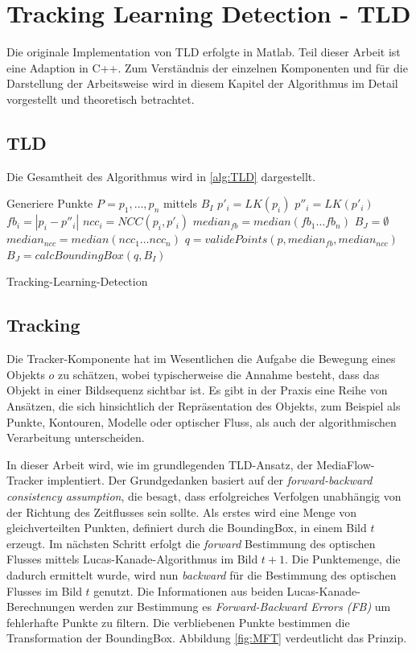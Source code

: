 \section{Tracking Learning Detection - TLD}
	Die originale Implementation von TLD erfolgte in Matlab. Teil dieser Arbeit ist eine Adaption in C++. Zum Verständnis der einzelnen Komponenten und für die Darstellung der Arbeitsweise wird in diesem Kapitel der Algorithmus im Detail vorgestellt und theoretisch betrachtet.

	\subsection{TLD}
	Die Gesamtheit des Algorithmus wird in \ref{alg:TLD} dargestellt. 

	\begin{algorithm}[H]
		\vspace{0.2cm}
		Generiere Punkte $P = p_{1},\ldots,p_{n}$ mittels $B_{I}$\;
		 {
			$p'_{i}=LK(p_{i})$\;
			$p''_{i}=LK(p'_{i})$\;
			$fb_{i}=|p_{i}-p''_{i}|$\;
			$ncc_{i}=NCC(p_{i},p'_{i})$\;
		}
		$median_{fb}=median(fb_{1}\ldots fb_{n})$\;
		 { 
			$B_{J}=\emptyset$\;
		} {
			$median_{ncc}=median(ncc_{1}\dots ncc_{n})$\;
			$q=validePoints(p,median_{fb},median_{ncc})$\;
			$B_{J}=calcBoundingBox(q,B_{I})$\;
		}
		\caption{Tracking-Learning-Detection}
		\label{alg:TLD}
		\vspace{0.2cm}
	\end{algorithm}

	\subsection{Tracking}
	Die Tracker-Komponente hat im Wesentlichen die Aufgabe die Bewegung eines Objekts $o$ zu schätzen, wobei typischerweise die Annahme besteht, dass das Objekt in einer Bildsequenz sichtbar ist. Es gibt in der Praxis eine Reihe von Ansätzen, die sich hinsichtlich der Repräsentation des Objekts, zum Beispiel als Punkte, Kontouren, Modelle oder optischer Fluss, als auch der algorithmischen Verarbeitung unterscheiden.

	In dieser Arbeit wird, wie im grundlegenden TLD-Ansatz, der MediaFlow- Tracker \cite{MFT} implentiert. Der Grundgedanken basiert auf der\textit{ forward-backward consistency assumption}, die besagt, dass erfolgreiches Verfolgen unabhängig von der Richtung des Zeitflusses sein sollte. Als erstes wird eine Menge von gleichverteilten Punkten, definiert durch die BoundingBox, in einem Bild $t$ erzeugt. Im nächsten Schritt erfolgt die \textit{forward} Bestimmung des optischen Flusses mittels Lucas-Kanade-Algorithmus \cite{OPT} im Bild $t+1$. Die Punktemenge, die dadurch ermittelt wurde, wird nun \textit{backward} für die Bestimmung des optischen Flusses im Bild $t$ genutzt. Die Informationen aus beiden Lucas-Kanade-Berechnungen werden zur Bestimmung es \textit{Forward-Backward Errors (FB)} um fehlerhafte Punkte zu filtern. Die verbliebenen Punkte bestimmen die Transformation der BoundingBox. Abbildung \ref{fig:MFT} verdeutlicht das Prinzip.

